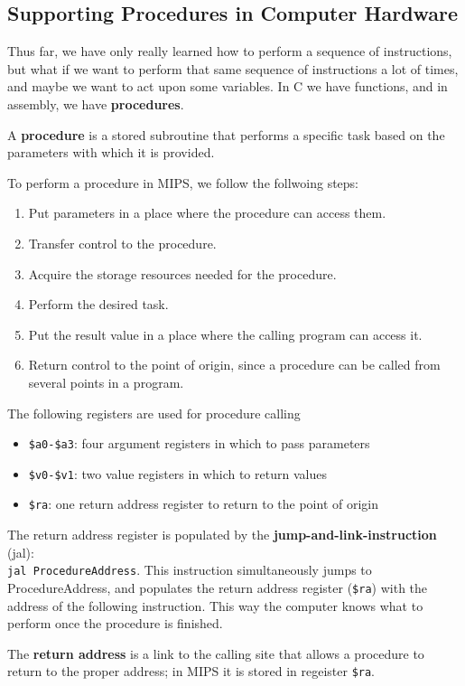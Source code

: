\documentclass[10pt]{article}
\begin{document}
\subsection{Supporting Procedures in Computer Hardware}\label{subsec:}
Thus far, we have only really learned how to perform a sequence of instructions, but what if we want to perform that same sequence of instructions a lot of times, and maybe we want to act upon some variables.  In C we have functions, and in assembly, we have \textbf{procedures}.
\begin{marginfigure}
  A \textbf{procedure} is a stored subroutine that performs a specific task based on the parameters with which it is provided.
\end{marginfigure}%
To perform a procedure in MIPS, we follow the follwoing steps:
  \begin{enumerate}
  \item Put parameters in a place where the procedure can access them.
\item Transfer control to the procedure.
\item Acquire the storage resources needed for the procedure.
\item Perform the desired task.
\item Put the result value in a place where the calling program can access it.
\item Return control to the point of origin, since a procedure can be called from several points in a program.
\end{enumerate}
The following registers are used for procedure calling
\begin{itemize}
\item \texttt{\$a0-\$a3}: four argument registers in which to pass parameters
\item \texttt{\$v0-\$v1}: two value registers in which to return values
\item \texttt{\$ra}: one return address register to return to the point of origin 
\end{itemize}
The return address register is populated by the \textbf{jump-and-link-instruction} (jal):\\

\texttt{jal ProcedureAddress}. 
This instruction simultaneously jumps to ProcedureAddress, and populates the return address register (\texttt{\$ra}) with the address of the following instruction.  This way the computer knows what to perform once the procedure is finished.
\begin{marginfigure}
The \textbf{return address} is a link to the calling site that allows a procedure to return to the proper address; in MIPS it is stored in regeister \texttt{\$ra}. 
\end{marginfigure}%
\end{document}
